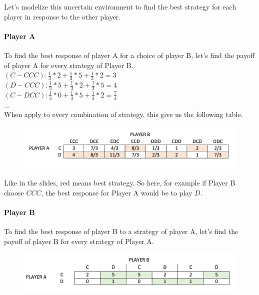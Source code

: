 \documentclass[11pt]{article}
\begin{document}
Let's modelize this uncertain environment to find the best strategy for each player in response to the other player.

\paragraph{Player A}

To find the best response of player A for a choice of player B, let's find the payoff of player A for every strategy of Player B. \\

$(C - CCC): \frac{1}{3}*2 + \frac{1}{3}*5 + \frac{1}{3}*2 = 3 $ \\

$(D - CCC): \frac{1}{3}*5 + \frac{1}{3}*2 + \frac{1}{3}*5 = 4 $ \\

$(C - DCC): \frac{1}{3}*0 + \frac{1}{3}*5 + \frac{1}{3}*2 = \frac{7}{3} $ \\

$ ... $ \\

When apply to every combination of strategy, this give us the following table.

\begin{figure}[H]
   \includegraphics[width=\textwidth]{img/exo2-table1.png}
\end{figure}

Like in the slides, red means best strategy. So here, for example if Player B choose $CCC$, the best response for Player A would be to play $D$.


\paragraph{Player B}

To find the best response of player B to a strategy of player A, let's find the payoff of player B for every strategy of Player A.

\begin{figure}[H]
   \includegraphics[width=\textwidth]{img/exo2-table2.png}
\end{figure}
\end{document}

